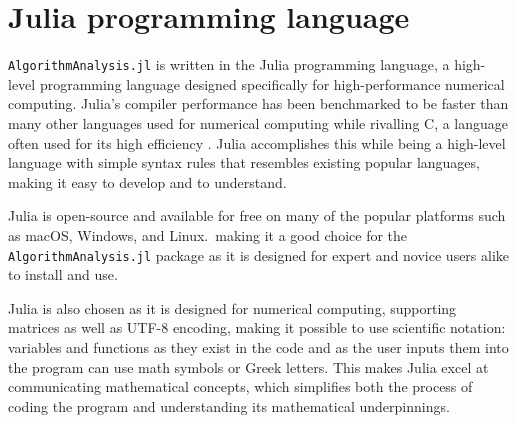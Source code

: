 \section{Julia programming language}

\texttt{AlgorithmAnalysis.jl} is written in the Julia programming language, a high-level programming language designed specifically for high-performance numerical computing. Julia's compiler performance has been benchmarked to be faster than many other languages used for numerical computing while rivalling C, a language often used for its high efficiency \cite{julia}. Julia accomplishes this while being a high-level language with simple syntax rules that resembles existing popular languages, making it easy to develop and to understand.

Julia is open-source and available for free on many of the popular platforms such as macOS, Windows, and Linux.\, making it a good choice for the \texttt{AlgorithmAnalysis.jl} package as it is designed for expert and novice users alike to install and use.

Julia is also chosen as it is designed for numerical computing, supporting matrices as well as UTF-8 encoding, making it possible to use scientific notation: variables and functions as they exist in the code and as the user inputs them into the program can use math symbols or Greek letters. This makes Julia excel at communicating mathematical concepts, which simplifies both the process of coding the program and understanding its mathematical underpinnings.

